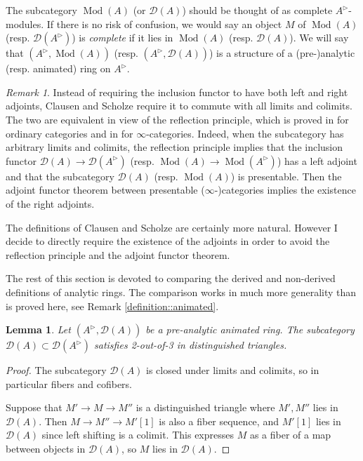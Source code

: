 \documentclass{article}
\theoremstyle{plain}
\newtheorem{lem}[thm]{Lemma}
\theoremstyle{definition}
\theoremstyle{remark}
\newtheorem{rmk}[thm]{Remark}
\DeclareMathOperator{\modcat}{Mod}
\newcommand{\huflag}{\triangleright}
\newcommand{\D}{\mathcal{D}}
\begin{document}
The subcategory $ \modcat (A) $ (or $ \D (A) $) should be thought of as complete $ A ^{\huflag} $-modules.
If there is no risk of confusion, we would say an object $ M $ of $ \modcat (A) $ (resp. $ \D (A ^{\huflag}) $) is
\emph{complete} if it lies in $ \modcat (A) $ (resp. $\D (A) $).
We will say that $ (A ^{\huflag}, \modcat (A)) $ (resp. $ (A ^{\huflag}, \D (A)) $) is a structure of a (pre-)analytic (resp. animated) ring on $ A ^{\huflag} $.

\begin{rmk}
\label{definition::nonsense}
Instead of requiring the inclusion functor to have both left and right adjoints,
Clausen and Scholze require it to commute with all limits and colimits.
The two are equivalent in view of the reflection principle,
which is proved in \cite{adamek_reflections_1989} for ordinary categories and in \cite{ragimov_infty-categorical_2022} for $ \infty $-categories.
Indeed, when the subcategory has arbitrary limits and colimits,
the reflection principle implies that the inclusion functor $ \D (A)\to \D (A ^{\huflag}) $ (resp. $ \modcat (A)\to \modcat (A ^{\huflag}) $)
has a left adjoint and that the subcategory
$ \D (A) $ (resp. $ \modcat (A) $) is presentable.
Then the adjoint functor theorem between presentable ($ \infty $-)categories implies the existence of the right adjoints.

The definitions of Clausen and Scholze are certainly more natural.
However I decide to directly require the existence of the adjoints in order to avoid the reflection principle and the adjoint functor theorem.
\end{rmk}

The rest of this section is devoted to comparing the derived and non-derived definitions of analytic rings.
The comparison works in much more generality than is proved here, see Remark \ref{definition::animated}.

\begin{lem}
Let $ (A ^{\huflag}, \D (A)) $ be a pre-analytic animated ring.
The subcategory $ \D (A)\subset \D (A ^{\huflag}) $ satisfies 2-out-of-3 in distinguished triangles.
\end{lem}

\begin{proof}
The subcategory $ \D (A) $ is closed under limits and colimits, so in particular fibers and cofibers.

Suppose that $ M'\to M\to M'' $ is a distinguished triangle where $ M',M'' $ lies in $ \D (A) $.
Then $ M\to M''\to M'[1] $ is also a fiber sequence, and $ M' [1] $ lies in $ \D (A) $ since left shifting is a colimit.
This expresses $ M $ as a fiber of a map between objects in $ \D (A) $, so $ M $ lies in $ \D (A) $.
\end{proof}
\end{document}

